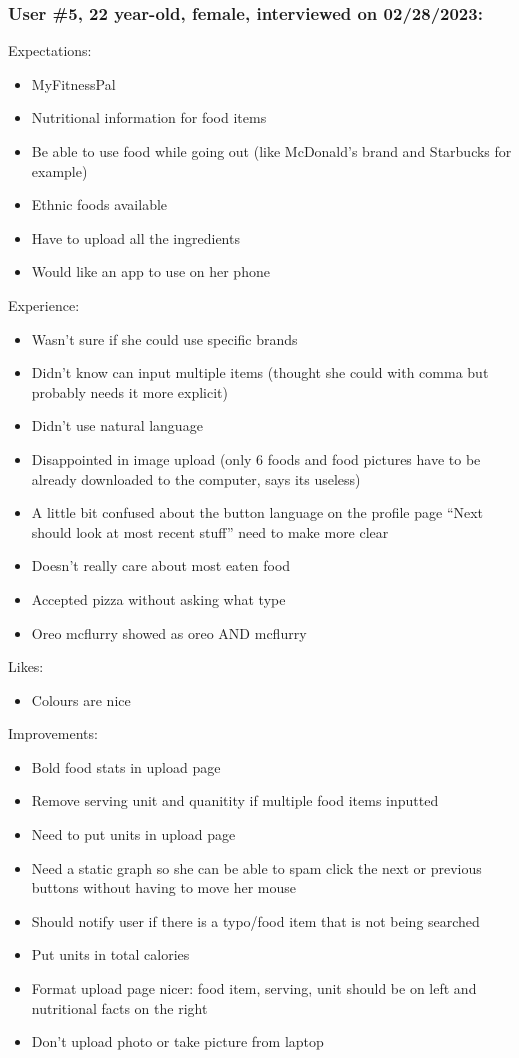 \documentclass[12pt, titlepage]{article}
\begin{document}
	\subsubsection*{User \#5, 22 year-old, female, interviewed on 02/28/2023:}
	Expectations:
	\begin{itemize}
		\item  MyFitnessPal
		\item Nutritional information for food items
		\item Be able to use food while going out (like McDonald's brand and Starbucks for example)
		\item Ethnic foods available
		\item Have to upload all the ingredients
		\item Would like an app to use on her phone
	\end{itemize}
	Experience:
	\begin{itemize}
		\item Wasn't sure if she could use specific brands
		\item Didn’t know can input multiple items (thought she could with comma but probably needs it more
		explicit)
		\item Didn’t use natural language
		\item  Disappointed in image upload (only 6 foods and food pictures have to be already downloaded to
		the computer, says its useless)
		\item A little bit confused about the button language on the profile page “Next should look at most
		recent stuff” need to make more clear
		\item Doesn’t really care about most eaten food
		\item Accepted pizza without asking what type
		\item Oreo mcflurry showed as oreo AND mcflurry
	\end{itemize}
	Likes:
	\begin{itemize}
		\item Colours are nice
	\end{itemize}
	Improvements:
	\begin{itemize}
		\item Bold food stats in upload page
		\item Remove serving unit and quanitity if multiple food items inputted
		\item Need to put units in upload page
		\item Need a static graph so she can be able to spam click the next or previous buttons without
		having to move her mouse
		\item Should notify user if there is a typo/food item that is not being searched
		\item Put units in total calories
		\item Format upload page nicer: food item, serving, unit should be on left and nutritional facts on the
		right
		\item Don’t upload photo or take picture from laptop
	\end{itemize}
\end{document}
